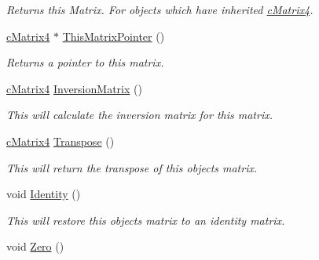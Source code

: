 \begin{DoxyCompactItemize}
\begin{DoxyCompactList}\small\item\em Returns this Matrix. For objects which have inherited \hyperlink{classc_matrix4}{cMatrix4}. \end{DoxyCompactList}\item 
\hypertarget{classc_matrix4_a5b57ac77fee2c235af694060361f84d2}{
\hyperlink{classc_matrix4}{cMatrix4} $\ast$ \hyperlink{classc_matrix4_a5b57ac77fee2c235af694060361f84d2}{ThisMatrixPointer} ()}
\label{classc_matrix4_a5b57ac77fee2c235af694060361f84d2}

\begin{DoxyCompactList}\small\item\em Returns a pointer to this matrix. \end{DoxyCompactList}\item 
\hypertarget{classc_matrix4_a88d1247e71bb96965a0e847a7a72e2dc}{
\hyperlink{classc_matrix4}{cMatrix4} \hyperlink{classc_matrix4_a88d1247e71bb96965a0e847a7a72e2dc}{InversionMatrix} ()}
\label{classc_matrix4_a88d1247e71bb96965a0e847a7a72e2dc}

\begin{DoxyCompactList}\small\item\em This will calculate the inversion matrix for this matrix. \end{DoxyCompactList}\item 
\hypertarget{classc_matrix4_ac8b6f1a9352943cd86ef4c088c438307}{
\hyperlink{classc_matrix4}{cMatrix4} \hyperlink{classc_matrix4_ac8b6f1a9352943cd86ef4c088c438307}{Transpose} ()}
\label{classc_matrix4_ac8b6f1a9352943cd86ef4c088c438307}

\begin{DoxyCompactList}\small\item\em This will return the transpose of this objects matrix. \end{DoxyCompactList}\item 
\hypertarget{classc_matrix4_a6aa4f58a001499cd666f9d65f3a821a0}{
void \hyperlink{classc_matrix4_a6aa4f58a001499cd666f9d65f3a821a0}{Identity} ()}
\label{classc_matrix4_a6aa4f58a001499cd666f9d65f3a821a0}

\begin{DoxyCompactList}\small\item\em This will restore this objects matrix to an identity matrix. \end{DoxyCompactList}\item 
\hypertarget{classc_matrix4_acf16f37d849137d2e410ec20f2b4e74d}{
void \hyperlink{classc_matrix4_acf16f37d849137d2e410ec20f2b4e74d}{Zero} ()}
\label{classc_matrix4_acf16f37d849137d2e410ec20f2b4e74d}


\end{DoxyCompactItemize}
